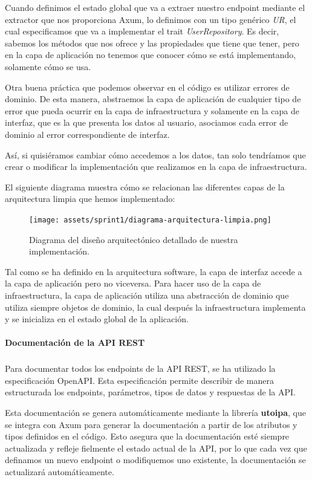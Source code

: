 Cuando definimos el estado global que va a extraer nuestro endpoint mediante el extractor que nos proporciona Axum, lo definimos con un tipo genérico \textit{UR}, el cual especificamos que va a implementar el trait \textit{UserRepository}. Es decir, sabemos los métodos que nos ofrece y las propiedades que tiene que tener, pero en la capa de aplicación no tenemos que conocer cómo se está implementando, solamente cómo se usa.

Otra buena práctica que podemos observar en el código es utilizar errores de dominio. De esta manera, abstraemos la capa de aplicación de cualquier tipo de error que pueda ocurrir en la capa de infraestructura y solamente en la capa de interfaz, que es la que presenta los datos al usuario, asociamos cada error de dominio al error correspondiente de interfaz.

Así, si quisiéramos cambiar cómo accedemos a los datos, tan solo tendríamos que crear o modificar la implementación que realizamos en la capa de infraestructura.

El siguiente diagrama muestra cómo se relacionan las diferentes capas de la arquitectura limpia que hemos implementado:
\begin{figure}[H]
    \begin{center}
        \texttt{[image: assets/sprint1/diagrama-arquitectura-limpia.png]}
    \end{center}
    \caption{Diagrama del diseño arquitectónico detallado de nuestra implementación.}\label{fig:diagrama-arquitectura-limpia-sprint1}
\end{figure}

Tal como se ha definido en la arquitectura software, la capa de interfaz accede a la capa de aplicación pero no viceversa. Para hacer uso de la capa de infraestructura, la capa de aplicación utiliza una abstracción de dominio que utiliza siempre objetos de dominio, la cual después la infraestructura implementa y se inicializa en el estado global de la aplicación.

\paragraph{Documentación de la API REST}
\subparagraph{}

Para documentar todos los endpoints de la API REST, se ha utilizado la especificación OpenAPI. Esta especificación permite describir de manera estructurada los endpoints, parámetros, tipos de datos y respuestas de la API.

Esta documentación se genera automáticamente mediante la librería \textbf{utoipa}, que se integra con Axum para generar la documentación a partir de los atributos y tipos definidos en el código. 
Esto asegura que la documentación esté siempre actualizada y refleje fielmente el estado actual de la API, por lo que cada vez que definamos un nuevo endpoint o modifiquemos uno existente, la documentación se actualizará automáticamente.

